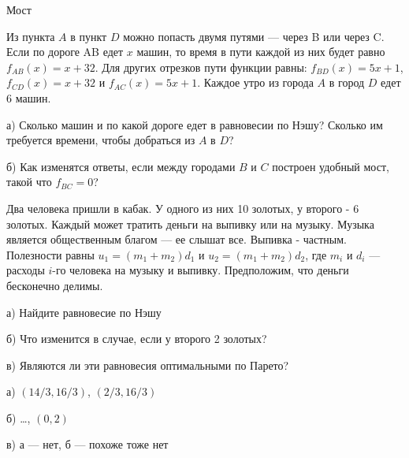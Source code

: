 \begin{problem}
 Мост \par
Из пункта $A$ в пункт $D$ можно попасть двумя путями — через B или
через C. Если по дороге AB едет $x$ машин, то время в пути каждой
из них будет равно $f_{AB}(x)=x+32$. Для других отрезков пути
функции равны: $f_{BD}(x)=5x+1$, $f_{CD}(x)=x+32$ и
$f_{AC}(x)=5x+1$.
Каждое утро из города $A$ в город $D$ едет 6 машин. \par
{}
а) Сколько машин и по какой дороге едет в равновесии по Нэшу?
Сколько им требуется времени, чтобы добраться из $A$ в $D$? \par
б) Как изменятся ответы, если между городами $B$ и $C$ построен
удобный мост, такой что $f_{BC}=0$?



\begin{sol}

\end{sol}
\end{problem}



\begin{problem}
 Два человека пришли в кабак. У одного из них 10 золотых, у второго
- 6 золотых. Каждый может тратить деньги на выпивку или на музыку.
Музыка является общественным благом — ее слышат все. Выпивка -
частным. Полезности равны $u_{1}=(m_{1}+m_{2})d_{1}$ и
$u_{2}=(m_{1}+m_{2})d_{2}$, где $m_{i}$ и $d_{i}$ — расходы $i$-го
человека на музыку и выпивку. Предположим, что деньги бесконечно
делимы. \par
а) Найдите равновесие по Нэшу \par
б) Что изменится в случае, если у второго 2 золотых? \par
в) Являются ли эти равновесия оптимальными по Парето?



\begin{sol}

а) $(14/3,16/3)$, $(2/3,16/3)$ \par
б) \ldots , $(0,2)$ \par
в) а — нет, б — похоже тоже нет
\end{sol}
\end{problem}




